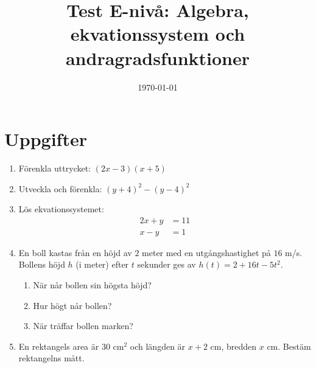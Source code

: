 \documentclass[a4paper,11pt]{article}
\title{Test E-nivå: Algebra, ekvationssystem och andragradsfunktioner}
\author{}
\date{\today}
\begin{document}
\maketitle

\section*{Uppgifter}
\begin{enumerate}[label=\textbf{\arabic*.}]
    \item Förenkla uttrycket: $(2x - 3)(x + 5)$

    \item Utveckla och förenkla: $(y + 4)^2 - (y - 4)^2$

    \item Lös ekvationssystemet:
    \begin{align*}
    2x + y &= 11 \\
    x - y &= 1
    \end{align*}

    \item En boll kastas från en höjd av $2$ meter med en utgångshastighet på $16$ m/s. Bollens höjd $h$ (i meter) efter $t$ sekunder ges av $h(t) = 2 + 16t - 5t^2$.
    \begin{enumerate}[label=\alph*)]
        \item När når bollen sin högsta höjd?
        \item Hur högt når bollen?
        \item När träffar bollen marken?
    \end{enumerate}

    \item En rektangels area är $30$ cm$^2$ och längden är $x+2$ cm, bredden $x$ cm. Bestäm rektangelns mått.
\end{enumerate}

\newpage
\end{document}
